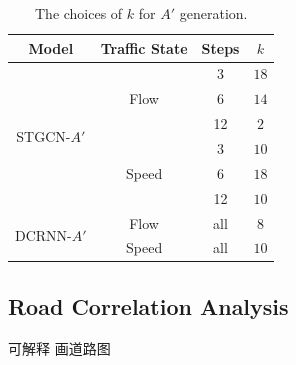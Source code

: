\begin{table}[htb]
    \renewcommand\arraystretch{1.5} %
    \begin{center}
        \caption{The choices of $k$ for $A'$ generation.}
        \label{k_table}
        \begin{tabular}{c|c|c|c}
            \toprule
  
            \textbf{Model} & \textbf{Traffic State} & \textbf{Steps} & \textbf{$k$}\\
  
            \hline
  
            \multirow{6}{*}{STGCN-$A'$} & \multirow{3}{*}{Flow} & 3 & $18$\\
            ~ & ~ & 6 & $14$\\
            ~ & ~ & 12 & $2$\\
            \cline{2-4}
            ~ & \multirow{3}{*}{Speed} & 3 & $10$\\
            ~ & ~ & 6 & $18$\\
            ~ & ~ & 12 & $10$\\

            \hline

            \multirow{2}{*}{DCRNN-$A'$} & Flow & all & $8$\\
            \cline{2-4}
            ~ & Speed & all & $10$\\
  
            \bottomrule
        \end{tabular}
    \end{center}
\end{table}

\subsection{Road Correlation Analysis}
可解释
画道路图

